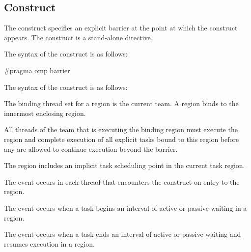 \subsection{ Construct}
\label{subsec:barrier Construct}
\summary
The  construct specifies an explicit barrier at the point at which 
the construct appears. The  construct is a stand-alone directive.

\syntax
\begin{ccppspecific}
The syntax of the  construct is as follows:

\begin{ompcPragma}
#pragma omp barrier 
\end{ompcPragma}
\end{ccppspecific}

\begin{fortranspecific}
The syntax of the  construct is as follows:

\end{fortranspecific}

\binding
The binding thread set for a  region is the current team. A 
 region binds to the innermost enclosing  region.

\descr
All threads of the team that is executing the binding  region must 
execute the  region and complete execution of all explicit tasks 
bound to this  region before any are allowed to continue execution 
beyond the barrier.

The  region includes an implicit task scheduling point in the current 
task region.

\events

The  event occurs in each thread that encounters the
 construct on entry to the  region.

The  event occurs when a task begins an interval 
of active or passive waiting in a  region.

The  event occurs when a task ends an interval of 
active or passive waiting and resumes execution in a  region.

